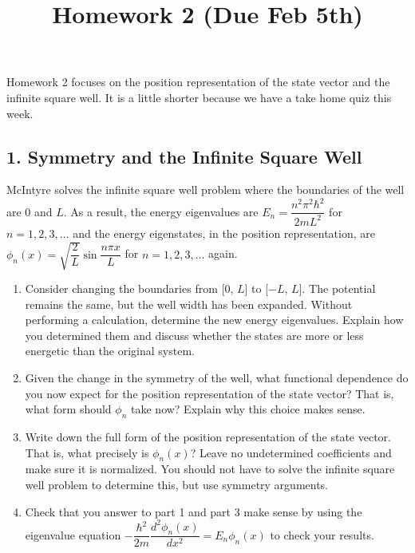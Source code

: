 \documentclass[
]{article}
\title{Homework 2 (Due Feb 5th)}
\author{}
\date{}
\providecommand{\tightlist}{%
  \setlength{\itemsep}{0pt}\setlength{\parskip}{0pt}}
\providecommand{\tightlist}{%
  \setlength{\itemsep}{0pt}\setlength{\parskip}{0pt}}
\begin{document}
\maketitle


Homework 2 focuses on the position representation of the state vector
and the infinite square well. It is a little shorter because we have a
take home quiz this week.

\hypertarget{symmetry-and-the-infinite-square-well}{%
\subsection{1. Symmetry and the Infinite Square
Well}\label{symmetry-and-the-infinite-square-well}}

McIntyre solves the infinite square well problem where the boundaries of
the well are 0 and \(L\). As a result, the energy eigenvalues are
\(E_n = \dfrac{n^2\pi^2\hbar^2}{2mL^2}\) for \(n = 1,2,3,\dots\) and the
energy eigenstates, in the position representation, are
\(\phi_n(x) = \sqrt{\dfrac{2}{L}} \sin \dfrac{n\pi x}{L}\) for
\(n = 1,2,3,\dots\) again.

\begin{enumerate}
\def\labelenumi{\arabic{enumi}.}
\tightlist
\item
  Consider changing the boundaries from {[}0, \(L\){]} to {[}\(-L\),
  \(L\){]}. The potential remains the same, but the well width has been
  expanded. Without performing a calculation, determine the new energy
  eigenvalues. Explain how you determined them and discuss whether the
  states are more or less energetic than the original system.
\item
  Given the change in the symmetry of the well, what functional
  dependence do you now expect for the position representation of the
  state vector? That is, what form should \(\phi_n\) take now? Explain
  why this choice makes sense.
\item
  Write down the full form of the position representation of the state
  vector. That is, what precisely is \(\phi_n(x)\)? Leave no
  undetermined coefficients and make sure it is normalized. You should
  not have to solve the infinite square well problem to determine this,
  but use symmetry arguments.
\item
  Check that you answer to part 1 and part 3 make sense by using the
  eigenvalue equation
  \(-\dfrac{\hbar^2}{2m} \dfrac{d^2\phi_n(x)}{dx^2} = E_n \phi_n(x)\) to
  check your results.
\end{enumerate}
\end{document}
